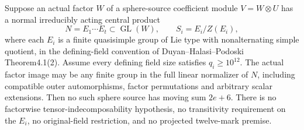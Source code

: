 \begin{theorem}[D-TD03]
Suppose an actual factor \(W\) of a sphere-source coefficient
module \(V=W\otimes U\) has a normal irreducibly acting central product
\[
       N=E_1\cdots E_t\subset\operatorname{GL}(W),
       \qquad S_i=E_i/Z(E_i),
       \tag{TD.21}
\]
where each \(E_i\) is a finite quasisimple group of Lie type with
nonalternating simple quotient, in the defining-field convention of
Duyan--Halasi--Podoski Theorem4.1(2).
Assume every defining field size satisfies \(q_i\ge10^{12}\).
The actual factor image may be any finite group in the full linear
normalizer of \(N\), including compatible outer automorphisms,
factor permutations and arbitrary scalar extensions.
Then no such sphere source has moving sum \(2e+6\).
There is no factorwise tensor-indecomposability hypothesis, no
transitivity requirement on the \(E_i\), no original-field restriction,
and no projected twelve-mark premise.
\end{theorem}

